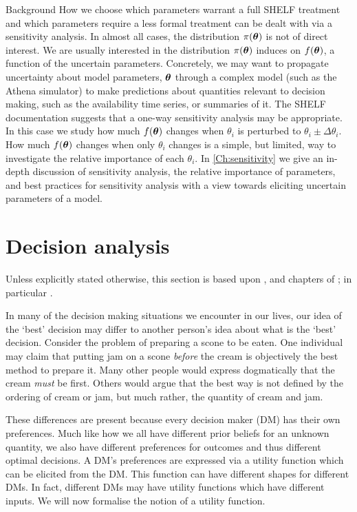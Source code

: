 \begin{chapter}{Background \label{Ch:background}}
How we choose which parameters warrant a full SHELF treatment and which parameters require a less formal treatment can be dealt with via a sensitivity analysis. In almost all cases, the distribution $\pi(\bm{\theta})$ is not of direct interest. We are usually interested in the distribution $\pi(\bm{\theta})$ induces on $f(\bm{\theta})$, a function of the uncertain parameters. Concretely, we may want to propagate uncertainty about model parameters, $\bm{\theta}$ through a complex model (such as the Athena simulator) to make predictions about quantities relevant to decision making, such as the availability time series,  or summaries of it. The SHELF documentation suggests that a one-way sensitivity analysis may be appropriate. In this case we study how much $f(\bm{\theta})$ changes when $\theta_i$ is perturbed to $\theta_i \pm \Delta \theta_i$. How much $f(\bm{\theta})$ changes when only $\theta_i$ changes is a simple, but limited, way to investigate the relative importance of each $\theta_i$. In \cref{Ch:sensitivity} we give an in-depth discussion of sensitivity analysis, the relative importance of parameters, and best practices for sensitivity analysis with a view towards eliciting uncertain parameters of a model.

\section{Decision analysis \label{sec:decision}}

Unless explicitly stated otherwise, this section is based upon \citet{Keeney1976}, \citet{Smith2010} and chapters of \citet{ElicitationBook}; in particular \citet{Gonzalez2018}.

In many of the decision making situations we encounter in our lives, our idea of the `best' decision may differ to another person's idea about what is the `best' decision. Consider the problem of preparing a scone to be eaten. One individual may claim that putting jam on a scone \textit{before} the cream is objectively the best method to prepare it. Many other people would express dogmatically that the cream \textit{must} be first. Others would argue that the best way is not defined by the ordering of cream or jam, but much rather, the quantity of cream and jam.

These differences are present because every decision maker (DM) has their own preferences. Much like how we all have different prior beliefs for an unknown quantity, we also have different preferences for outcomes and thus different optimal decisions. A DM's preferences are expressed via a utility function which can be elicited from the DM. This function can have different shapes for different DMs. In fact, different DMs may have utility functions which have different inputs. We will now formalise the notion of a utility function.


\end{chapter}
